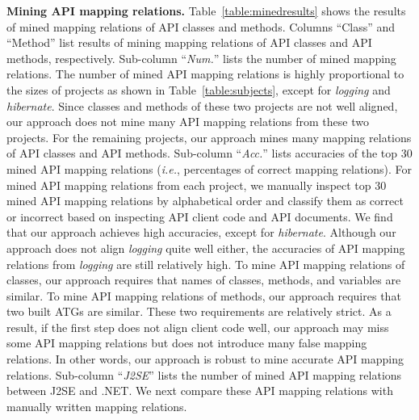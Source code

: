 \textbf{Mining API mapping relations.}
Table~\ref{table:minedresults} shows the results of mined mapping
relations of API classes and methods. Columns ``Class'' and ``Method''
list results of mining mapping relations of API classes and API methods, respectively. Sub-column
``\emph{Num.}'' lists the number of mined mapping relations. The
number of mined API mapping relations is highly proportional to the sizes
of projects as shown in Table~\ref{table:subjects}, except for
\emph{logging} and \emph{hibernate}. Since classes and methods of these
two projects are not well aligned, our approach does not mine
many API mapping relations from these two projects. For the
remaining projects, our approach mines many mapping relations of API
classes and API methods. Sub-column ``\emph{Acc.}'' lists accuracies
of the top 30 mined API mapping relations (\emph{i.e.}, percentages of correct
mapping relations). For mined API mapping relations from each project, we
manually inspect top 30 mined API mapping relations by alphabetical order and classify
them as correct or incorrect based on inspecting API client code and
API documents. We find that our approach achieves high accuracies, except for
\emph{hibernate}. Although our approach does not align
\emph{logging} quite well either, the accuracies of API mapping relations from
\emph{logging} are still relatively high. To mine API mapping relations of
classes, our approach requires that names of classes, methods, and
variables are similar. To mine API mapping relations of methods, our
approach requires that two built ATGs are
similar. These two requirements are relatively strict. As a result, if
the first step does not align client code well, our approach may
miss some API mapping relations but does not introduce many
false mapping relations. In other words, our approach is robust to
mine accurate API mapping relations. Sub-column ``\emph{J2SE}'' lists the number of mined
API mapping relations between J2SE and .NET. We next compare these API mapping
relations with manually written mapping relations.

